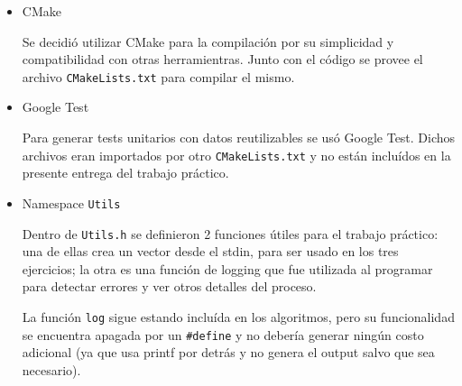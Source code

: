 	\begin{itemize}
		\item CMake

		Se decidió utilizar CMake para la compilación por su simplicidad y compatibilidad con otras herramientras. Junto con el código se provee el archivo \texttt{CMakeLists.txt} para compilar el mismo.

		\item Google Test

		Para generar tests unitarios con datos reutilizables se usó Google Test. Dichos archivos eran importados por otro \texttt{CMakeLists.txt} y no están incluídos en la presente entrega del trabajo práctico.

		\item Namespace \texttt{Utils}

		Dentro de \texttt{Utils.h} se definieron 2 funciones útiles para el trabajo práctico: una de ellas crea un vector desde el stdin, para ser usado en los tres ejercicios; la otra es una función de logging que fue utilizada al programar para detectar errores y ver otros detalles del proceso.

		La función \texttt{log} sigue estando incluída en los algoritmos, pero su funcionalidad se encuentra apagada por un \texttt{\#define} y no debería generar ningún costo adicional (ya que usa printf por detrás y no genera el output salvo que sea necesario).
	\end{itemize}